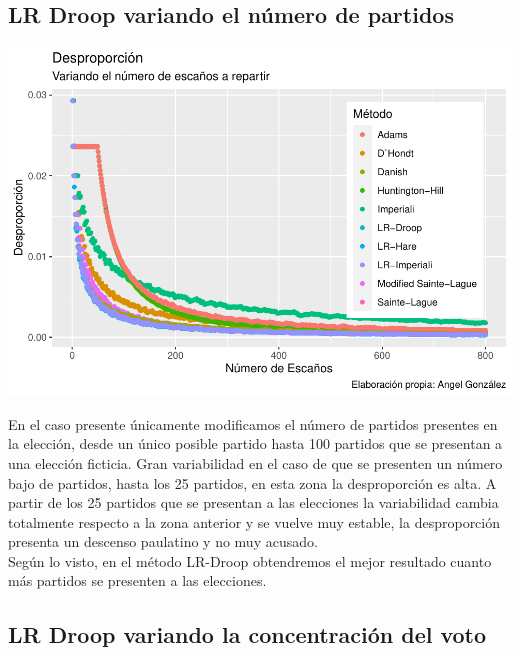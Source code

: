 \documentclass[12pt,a4paper,]{book}
\numberwithin{dummy}{section}
\theoremstyle{ocrenumbox}
\theoremstyle{blacknumex}
\theoremstyle{blacknumbox}
\theoremstyle{ocrenum}
\theoremstyle{ocrenum}
\begin{document}
\hypertarget{lr-droop-variando-el-nuxfamero-de-partidos}{%
\subsection{LR Droop variando el número de
partidos}\label{lr-droop-variando-el-nuxfamero-de-partidos}}

\begin{center}\includegraphics[width=0.95\linewidth]{figurasR/unnamed-chunk-54-1} \end{center}

En el caso presente únicamente modificamos el número de partidos
presentes en la elección, desde un único posible partido hasta 100
partidos que se presentan a una elección ficticia. Gran variabilidad en
el caso de que se presenten un número bajo de partidos, hasta los 25
partidos, en esta zona la desproporción es alta. A partir de los 25
partidos que se presentan a las elecciones la variabilidad cambia
totalmente respecto a la zona anterior y se vuelve muy estable, la
desproporción presenta un descenso paulatino y no muy acusado.\\
Según lo visto, en el método LR-Droop obtendremos el mejor resultado
cuanto más partidos se presenten a las elecciones.

\hypertarget{lr-droop-variando-la-concentraciuxf3n-del-voto}{%
\subsection{LR Droop variando la concentración del
voto}\label{lr-droop-variando-la-concentraciuxf3n-del-voto}}
\end{document}
